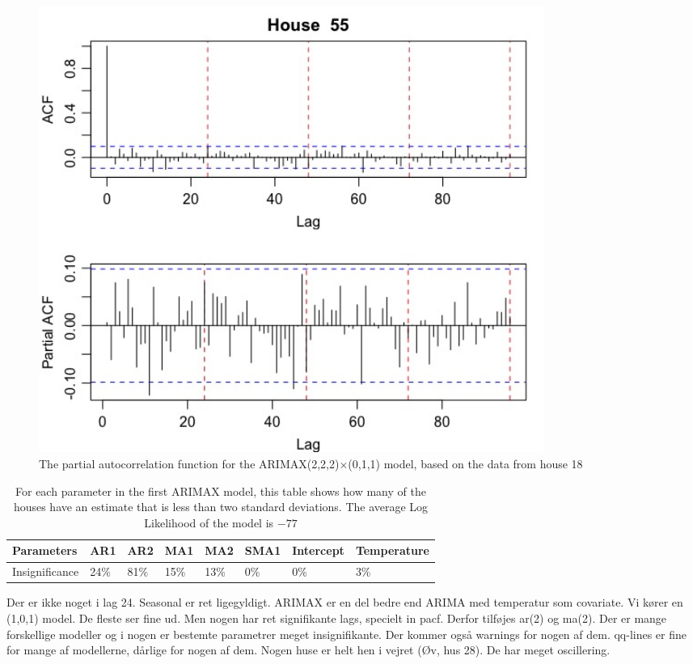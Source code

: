 \begin{figure}
    \centering
    \includegraphics[width=0.8\textwidth]{../../../figures/arimax/Arimax1_55.jpeg}
    \caption{The partial autocorrelation function for the ARIMAX(2,2,2)$\times$(0,1,1) model, based on the data from house 18}
    \label{arimax1_55}
\end{figure}

\begin{table}[]
    \begin{tabular}{|l|l|l|l|l|l|l|l|}
    \hline
    Parameters     & AR1  & AR2  & MA1  & MA2  & SMA1 & Intercept & Temperature \\ \hline
    Insignificance & 24\% & 81\% & 15\% & 13\% & 0\%  & 0\%       & 3\%         \\ \hline
    \end{tabular}
    \caption{For each parameter in the first ARIMAX model, this table shows how many of the houses have an estimate that is less than two standard deviations. The average Log Likelihood of the model is $-77$}
    \label{First arimax}
    \end{table}

Der er ikke noget i lag 24. Seasonal er ret ligegyldigt.
ARIMAX er en del bedre end ARIMA med temperatur som covariate.
Vi kører en (1,0,1) model. De fleste ser fine ud. Men nogen har ret signifikante lags, specielt in pacf.
Derfor tilføjes ar(2) og ma(2). Der er mange forskellige modeller og i nogen er bestemte parametrer meget insignifikante.
Der kommer også warnings for nogen af dem.
qq-lines er fine for mange af modellerne, dårlige for nogen af dem.
Nogen huse er helt hen i vejret (Øv, hus 28). De har meget oscillering.
